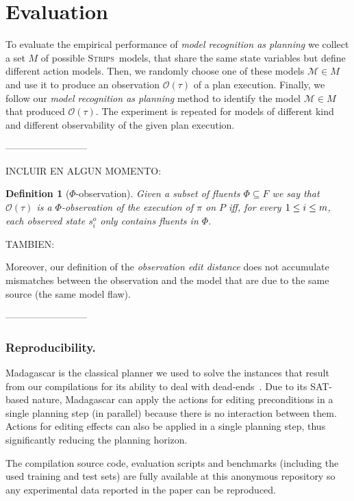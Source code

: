 \documentclass[letterpaper]{article} %
\newcommand{\strips}{\textsc{Strips}}     %
\newtheorem{definition}[theorem]{Definition}
\begin{document}
\section{Evaluation}
\label{sec:evaluation}

To evaluate the empirical performance of {\em model recognition as planning} we collect a set $M$ of possible \strips\ models, that share the same state variables but define different action models. Then, we randomly choose one of these models $\mathcal{M}\in M$ and use it to produce an observation $\mathcal{O}(\tau)$ of a plan execution. Finally, we follow our {\em model recognition as planning} method to identify the model $\mathcal{M}\in M$ that produced $\mathcal{O}(\tau)$. The experiment is repeated for models of different kind and different observability of the given plan execution.

--------------------------

INCLUIR EN ALGUN MOMENTO:

\begin{definition}[$\Phi$-observation]
Given a subset of fluents $\Phi\subseteq F$ we say that $\mathcal{O}(\tau)$ is a $\Phi$-observation of the execution of $\pi$ on $P$ iff, for every ${\small 1\leq i\leq m}$, each observed state $s_i^o$ only contains fluents in $\Phi$.
\end{definition}

TAMBIEN:

Moreover, our definition of the {\em observation edit distance} does not accumulate mismatches between the observation and the model that are due to the same source (the same model flaw).

--------------------------



\subsubsection{Reproducibility.} {\sc Madagascar} is the classical planner we used to solve the instances that result from our compilations for its ability to deal with dead-ends~\cite{rintanen2014madagascar}. Due to its SAT-based nature, {\sc Madagascar} can apply the actions for editing preconditions in a single planning step (in parallel) because there is no interaction between them. Actions for editing effects can also be applied in a single planning step, thus significantly reducing the planning horizon.

The compilation source code, evaluation scripts and benchmarks (including the used training and test sets) are fully available at this anonymous repository {\em } so any experimental data reported in the paper can be reproduced.
\end{document}
